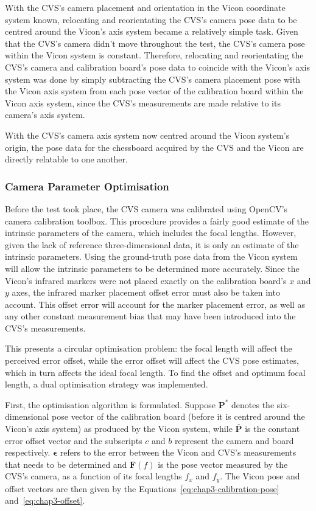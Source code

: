 With the CVS's camera placement and orientation in the Vicon coordinate system known, relocating and reorientating the CVS's camera pose data to be centred around the Vicon's axis system became a relatively simple task. Given that the CVS's camera didn't move throughout the test, the CVS's camera pose within the Vicon system is constant. Therefore, relocating and reorientating the CVS's camera and calibration board's pose data to coincide with the Vicon's axis system was done by simply subtracting the CVS's camera placement pose with the Vicon axis system from each pose vector of the calibration board within the Vicon axis system, since the CVS's measurements are made relative to its camera's axis system.

With the CVS's camera axis system now centred around the Vicon system's origin, the pose data for the chessboard acquired by the CVS and the Vicon are directly relatable to one another.  

\subsubsection{Camera Parameter Optimisation}
\label{sec:focal-optimisation}

Before the test took place, the CVS camera was calibrated using OpenCV's camera calibration toolbox. This procedure provides a fairly good estimate of the intrinsic parameters of the camera, which includes the focal lengths. However, given the lack of reference three-dimensional data, it is only an estimate of the intrinsic parameters. Using the ground-truth pose data from the Vicon system will allow the intrinsic parameters to be determined more accurately. Since the Vicon's infrared markers were not placed exactly on the calibration board's $x$ and $y$ axes, the infrared marker placement offset error must also be taken into account. This offset error will account for the marker placement error, as well as any other constant measurement bias that may have been introduced into the CVS's measurements. 

This presents a circular optimisation problem: the focal length will affect the perceived error offset, while the error offset will affect the CVS pose estimates, which in turn affects the ideal focal length. To find the offset and optimum focal length, a dual optimisation strategy was implemented.  

First, the optimisation algorithm is formulated. Suppose $\bm{P}^*$ denotes the six-dimensional pose vector of the calibration board (before it is centred around the Vicon's axis system) as produced by the Vicon system, while $\bar{\bm{P}}$ is the constant error offset vector and the subscripts $c$ and $b$ represent the camera and board respectively. $\bm{\epsilon}$ refers to the error between the Vicon and CVS's measurements that needs to be determined and $\bm{F}(f)$ is the pose vector measured by the CVS's camera, as a function of its focal lengths $f_x$ and $f_y$. The Vicon pose and offset vectors are then given by the Equations~\ref{eq:chap3-calibration-pose} and~\ref{eq:chap3-offset}.

